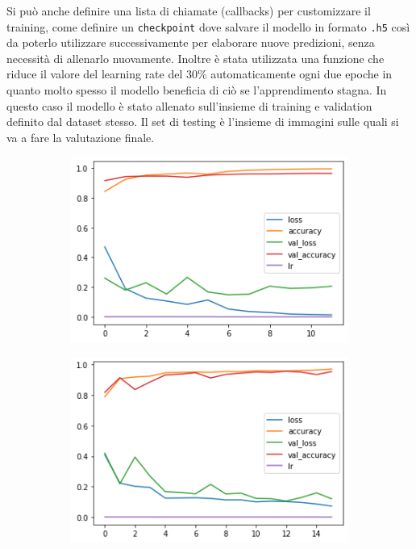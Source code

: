     Si può anche definire una lista di chiamate (callbacks) per 
    customizzare il training, come definire un \lstinline{checkpoint} dove salvare il modello in formato \lstinline{.h5} così 
    da poterlo utilizzare successivamente per elaborare nuove predizioni,
     senza necessità di allenarlo nuovamente.  Inoltre è stata utilizzata una funzione che riduce il 
     valore del learning rate del 30\% automaticamente ogni due epoche in quanto molto spesso 
     il modello beneficia di ciò se l’apprendimento stagna. 
In questo caso il modello è stato allenato sull’insieme di training e validation definito dal dataset stesso.
 Il set di testing è l’insieme di immagini sulle quali si va a fare la valutazione finale.
  \begin{figure}[H]
    \begin{subfigure}{0.5\textwidth}
      \centering
      \includegraphics[width=0.95\linewidth]{Figures/history-pneumonia-no-aug.png}
      \caption{}
      \label{fig:snap1}
    \end{subfigure}%
    \begin{subfigure}{0.5\textwidth}
      \centering
      \includegraphics[width=.95\linewidth]{Figures/history-pneumonia-aug1.png}

\end{subfigure}
\end{figure}
